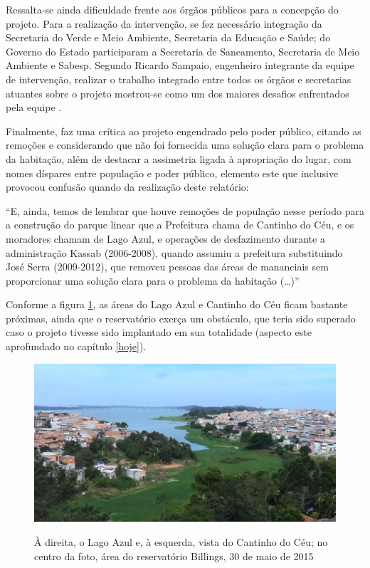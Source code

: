 	Ressalta-se ainda dificuldade frente aos órgãos públicos para a concepção do projeto. Para a realização da intervenção, se fez necessário integração da Secretaria do Verde e Meio Ambiente, Secretaria da Educação e Saúde; do Governo do Estado participaram a Secretaria de Saneamento, Secretaria de Meio Ambiente e Sabesp. Segundo Ricardo Sampaio, engenheiro integrante da equipe de intervenção, realizar o trabalho integrado entre todos os órgãos e secretarias atuantes sobre o projeto mostrou-se como um dos maiores desafios enfrentados pela equipe \cite{Barda2012}.
	
	Finalmente,  faz uma crítica ao projeto engendrado pelo poder público, citando as remoções e considerando que não foi fornecida uma solução clara para o problema da habitação, além de destacar a assimetria ligada à apropriação do lugar, com nomes díspares entre população e poder público, elemento este que inclusive provocou confusão quando da realização deste relatório:
	
	\begin{citacao}
		``E, ainda, temos de lembrar que houve remoções de população nesse período para a construção do parque linear que a Prefeitura chama de Cantinho do Céu, e os moradores chamam de Lago Azul, e operações de desfazimento durante a administração Kassab (2006-2008), quando	assumiu a prefeitura substituindo José Serra (2009-2012), que removeu pessoas das áreas de mananciais sem proporcionar uma solução clara para o problema da habitação (\dots)''
	\end{citacao}
	
	Conforme a figura \ref{fig:lago_cantinho}, as áreas do Lago Azul e Cantinho do Céu ficam bastante próximas, ainda que o reservatório exerça um obstáculo, que teria sido superado caso o projeto tivesse sido implantado em sua totalidade (aspecto este aprofundado no capítulo \ref{hoje}).
	
	\begin{figure}[htb]
		\centering
		\caption[Lago Azul e Cantinho do Céu em 30/05/2015]{À direita, o Lago Azul e, à esquerda, vista do Cantinho do Céu; no centro da foto, área do reservatório Billings, 30 de maio de 2015}
		\includegraphics[width=\linewidth]{img/silva_p080_lago_cantinho}
		\label{fig:lago_cantinho}
	\end{figure}
	
